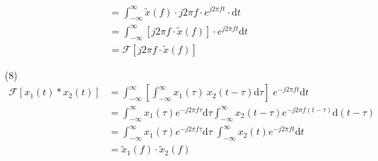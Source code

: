 \documentclass{article}
\begin{document}
\begin{enumerate}
\begin{align*}
        &= \int_{- \infty}^{\infty} \widetilde{x}(f) \cdot j2\pi f \cdot  e^{j2\pi f t} \cdot \mathrm{d}t\\
        &= \int_{- \infty}^{\infty} [j2\pi f \cdot \widetilde{x}(f)] \cdot  e^{j2\pi f t} \mathrm{d}t\\
        &= \mathcal{F} [j2\pi f \cdot \widetilde{x}(f)]
    \end{align*}
    \item[(8)]
    \begin{align*}
        \mathcal{F}[x_1(t)*x_2(t)] &= \int_{- \infty}^{\infty} \left[ \int_{- \infty}^{\infty} x_1(\tau) ~ x_2(t - \tau) \mathrm{d}\tau \right]  \; e^{-j2\pi f t} \mathrm{d}t\\
        &= \int_{- \infty}^{\infty} x_1(\tau) e^{-j2\pi f \tau} \mathrm{d}\tau 
        \int_{- \infty}^{\infty} x_2(t - \tau) e^{-j2\pi f (t - \tau)} \mathrm{d}(t - \tau)\\
        &= \int_{- \infty}^{\infty} x_1(\tau) e^{-j2\pi f \tau} \mathrm{d}\tau \; \int_{- \infty}^{\infty} x_2(t) e^{-j2\pi f t} \mathrm{d}t\\
        &= \widetilde{x}_1(f) \cdot \widetilde{x}_2(f)
    \end{align*}
\end{enumerate}

% 
% 

\begin{appendices}
    
\end{appendices}
\end{document}
